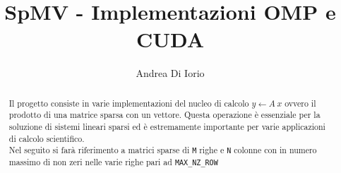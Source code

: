 \documentclass[acmsmall,nonacm=true]{acmart}
\newcommand{\vvv}[1]{{\small\texttt{#1}}}
\begin{document}
\title {SpMV - Implementazioni OMP e CUDA}


\author{Andrea Di Iorio}
\authorsaddresses{}	%

\renewcommand{\shortauthors}{Andrea Di Iorio}

\begin{abstract}
Il progetto consiste in varie implementazioni del nucleo di calcolo
$y \leftarrow A~x$ ovvero il prodotto di una matrice sparsa con un vettore.
Questa operazione è essenziale per la soluzione di sistemi lineari sparsi 
ed è estremamente importante per varie applicazioni di calcolo scientifico.\\ %
Nel seguito si farà riferimento a matrici sparse di \vvv{M} righe e \vvv{N} colonne con
in numero massimo di non zeri nelle varie righe pari ad \vvv{MAX\_NZ\_ROW}
\end{abstract}




\maketitle
\end{document}
